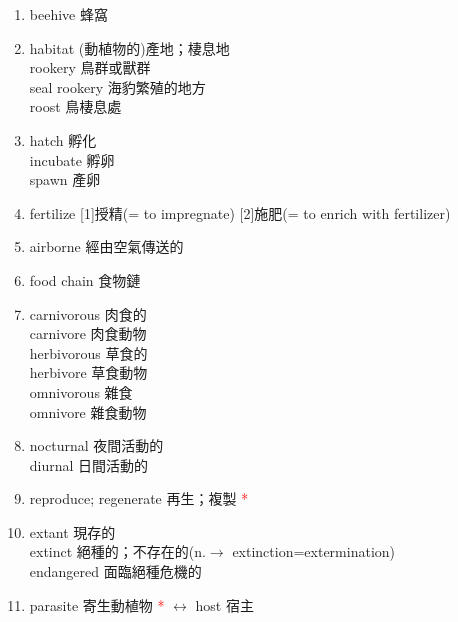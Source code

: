 \documentclass[twoside,b5paper]{book}
\begin{document}
\begin{enumerate}
    \item
      beehive  蜂窩
    \item
      habitat  (動植物的)產地；棲息地\\
      rookery  鳥群或獸群\\
      seal rookery 海豹繁殖的地方\\
      roost  鳥棲息處
    \item
      hatch  孵化\\
      incubate  孵卵\\
      spawn  產卵
    \item
      fertilize [1]授精(= to impregnate) [2]施肥(= to enrich with fertilizer)
    \item
      airborne  經由空氣傳送的
    \item
      food chain 食物鏈
    \item
      carnivorous  肉食的\\
      carnivore  肉食動物\\
      herbivorous  草食的\\
      herbivore  草食動物\\
      omnivorous  雜食\\
      omnivore  雜食動物
    \item
      nocturnal  夜間活動的\\
      diurnal  日間活動的
    \item
      reproduce; regenerate 再生；複製 \textcolor{red}{*}
    \item
      extant  現存的\\
      extinct  絕種的；不存在的(n.$\to$ extinction=extermination)\\
      endangered  面臨絕種危機的
    \item
      parasite  寄生動植物 \textcolor{red}{*} $\leftrightarrow$ host  宿主\\

\end{enumerate}
\end{document}
